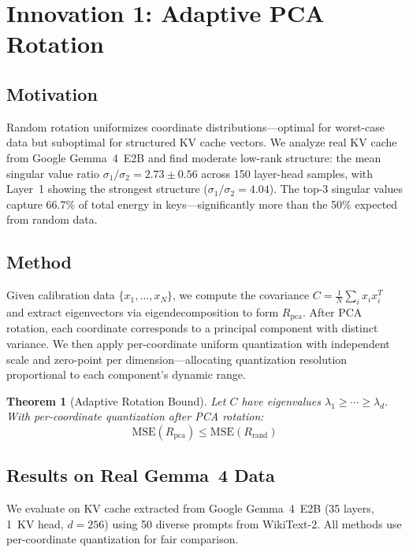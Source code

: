 \documentclass[10pt,twocolumn]{article}
\newtheorem{theorem}{Theorem}
\begin{document}
\section{Innovation 1: Adaptive PCA Rotation}

\subsection{Motivation}

Random rotation uniformizes coordinate distributions---optimal for worst-case data but suboptimal for structured KV cache vectors. We analyze real KV cache from Google Gemma~4~E2B and find moderate low-rank structure: the mean singular value ratio $\sigma_1/\sigma_2 = 2.73 \pm 0.56$ across 150 layer-head samples, with Layer~1 showing the strongest structure ($\sigma_1/\sigma_2 = 4.04$). The top-3 singular values capture 66.7\% of total energy in keys---significantly more than the 50\% expected from random data.

\subsection{Method}

Given calibration data $\{x_1, \ldots, x_N\}$, we compute the covariance $C = \frac{1}{N} \sum_i x_i x_i^T$ and extract eigenvectors via eigendecomposition to form $R_{\text{pca}}$. After PCA rotation, each coordinate corresponds to a principal component with distinct variance. We then apply per-coordinate uniform quantization with independent scale and zero-point per dimension---allocating quantization resolution proportional to each component's dynamic range.

\begin{theorem}[Adaptive Rotation Bound]
Let $C$ have eigenvalues $\lambda_1 \geq \cdots \geq \lambda_d$. With per-coordinate quantization after PCA rotation:
\begin{equation}
\text{MSE}(R_{\text{pca}}) \leq \text{MSE}(R_{\text{rand}})
\end{equation}
\end{theorem}

\subsection{Results on Real Gemma~4 Data}

We evaluate on KV cache extracted from Google Gemma~4~E2B (35 layers, 1~KV head, $d{=}256$) using 50 diverse prompts from WikiText-2. All methods use per-coordinate quantization for fair comparison.
\end{document}
